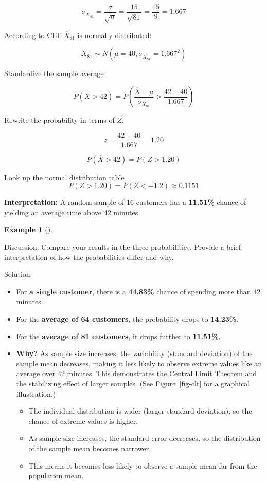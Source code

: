 \documentclass[
  12pt,
  a4paper,
]{scrbook}
\providecommand{\tightlist}{%
  \setlength{\itemsep}{0pt}\setlength{\parskip}{0pt}}
\renewcommand{\tightlist}{\setlength{\itemsep}{0.5\baselineskip}\setlength{\parskip}{0.2\baselineskip}}
\theoremstyle{plain}
\theoremstyle{definition}
\newtheorem{example}{Example}[chapter]
\theoremstyle{remark}
\begin{document}
\[
\sigma_{\overline{X}_{81}} = \frac{\sigma}{\sqrt{n}} = \frac{15}{\sqrt{81}} = \frac{15}{9} = 1.667
\]

According to CLT \(\overline{X}_{81}\) is normally distributed:

\[
\overline{X}_{81} \sim N(\mu= 40, \sigma_{\overline{X}_{81}} = 1.667^2)
\]

Standardize the sample average

\[
P(\overline{X} > 42) = P(\frac{\overline{X}-\mu}{\sigma_{\overline{X}_{81}}} > \frac{42-40}{1.667})
\]

Rewrite the probability in terms of \(Z\):

\[
z = \frac{42 - 40}{1.667} = 1.20
\]

\[
P(\overline{X} > 42) = P(Z > 1.20) 
\]

Look up the normal distribution table \[
P(Z > 1.20) = P(Z<-1.2) \approx 0.1151
\]

\textbf{Interpretation:} A random sample of 16 customers has a
\textbf{11.51\%} chance of yielding an average time above 42 minutes.

\begin{example}[]\protect\hypertarget{exm-clt4}{}\label{exm-clt4}

Discussion: Compare your results in the three probabilities. Provide a
brief interpretation of how the probabilities differ and why.

\end{example}

Solution

\protect{}\label{clt4}
\begin{itemize}
\item
  For \textbf{a single customer}, there is a \textbf{44.83\%} chance of
  spending more than 42 minutes.
\item
  For the \textbf{average of 64 customers}, the probability drops to
  \textbf{14.23\%}.
\item
  For the \textbf{average of 81 customers}, it drops further to
  \textbf{11.51\%}.
\item
  \textbf{Why?} As sample size increases, the variability (standard
  deviation) of the sample mean decreases, making it less likely to
  observe extreme values like an average over 42 minutes. This
  demonstrates the Central Limit Theorem and the stabilizing effect of
  larger samples. (See Figure~\ref{fig-clt} for a graphical
  illustration.)

  \begin{itemize}
  \tightlist
  \item
    The individual distribution is wider (larger standard deviation), so
    the chance of extreme values is higher.
  \item
    As sample size increases, the standard error decreases, so the
    distribution of the sample mean becomes narrower.
  \item
    This means it becomes less likely to observe a sample mean far from
    the population mean.
  \end{itemize}
\end{itemize}
\end{document}
